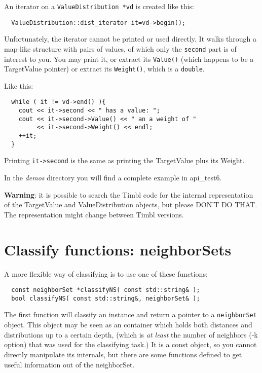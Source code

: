 \documentclass{report}
\begin{document}
An iterator on a {\tt ValueDistribution *vd} is created like this:
\begin{footnotesize}
\begin{verbatim}
  ValueDistribution::dist_iterator it=vd->begin();
\end{verbatim}
\end{footnotesize}

Unfortunately, the iterator cannot be printed or used directly.
It walks through a map-like structure with pairs of values, of which
only the {\tt second} part is of interest to you.
You may print it, or extract its {\tt Value()} (which happens to be a
TargetValue pointer) or extract its {\tt Weight()}, which is a {\tt double}.

Like this:
\begin{footnotesize}
\begin{verbatim}
  while ( it != vd->end() ){
    cout << it->second << " has a value: ";
    cout << it->second->Value() << " an a weight of "
         << it->second->Weight() << endl;
    ++it;
  }
\end{verbatim}
\end{footnotesize}

Printing {\tt it->second} is the same as printing the
TargetValue plus its Weight.

In the {\em demos}\/ directory you will find a complete example in api\_test6.

{\bf Warning}: it is possible to search the Timbl code for the
internal representation of the TargetValue and ValueDistribution
objects, but please DON'T DO THAT.  The representation might change
between Timbl versions.

\section{Classify functions: neighborSets}

A more flexible way of classifying is to use one of these functions:

\begin{footnotesize}
\begin{verbatim}
  const neighborSet *classifyNS( const std::string& );
  bool classifyNS( const std::string&, neighborSet& );
\end{verbatim}
\end{footnotesize}

The first function will classify an instance and return a pointer to a
{\tt neighborSet} object. This object may be seen as an container
which holds both distances and distributions up to a certain depth,
(which is {\em at least}\/ the number of neighbors (-k option) that
was used for the classifying task.)  It is a const object, so you
cannot directly manipulate its internals, but there are some
functions defined to get useful information out of the neighborSet.
\end{document}
